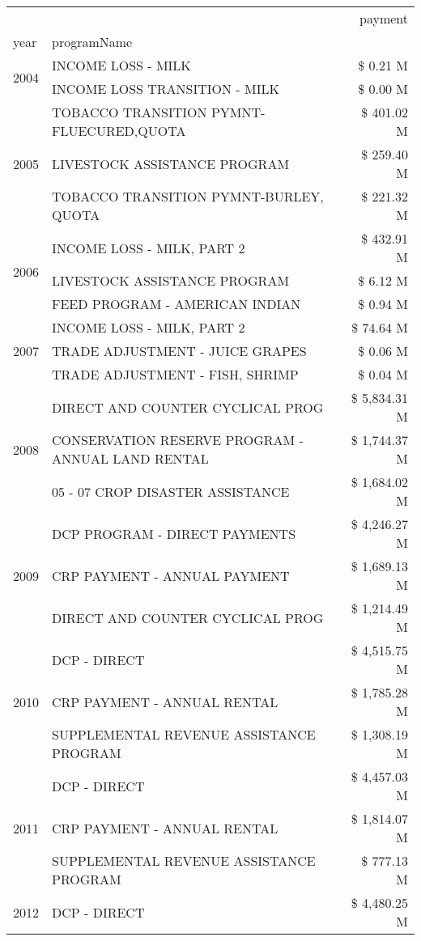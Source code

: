 \begin{tabular}{llr}
\toprule
 &  & payment \\
year & programName &  \\
\midrule
\multirow[t]{2}{*}{2004} & INCOME LOSS - MILK & \$ 0.21 M \\
 & INCOME LOSS TRANSITION - MILK & \$ 0.00 M \\
\cline{1-3}
\multirow[t]{3}{*}{2005} & TOBACCO TRANSITION PYMNT-FLUECURED,QUOTA & \$ 401.02 M \\
 & LIVESTOCK ASSISTANCE PROGRAM & \$ 259.40 M \\
 & TOBACCO TRANSITION PYMNT-BURLEY, QUOTA & \$ 221.32 M \\
\cline{1-3}
\multirow[t]{3}{*}{2006} & INCOME LOSS - MILK, PART 2 & \$ 432.91 M \\
 & LIVESTOCK ASSISTANCE PROGRAM & \$ 6.12 M \\
 & FEED PROGRAM - AMERICAN INDIAN & \$ 0.94 M \\
\cline{1-3}
\multirow[t]{3}{*}{2007} & INCOME LOSS - MILK, PART 2 & \$ 74.64 M \\
 & TRADE ADJUSTMENT - JUICE GRAPES & \$ 0.06 M \\
 & TRADE ADJUSTMENT - FISH, SHRIMP & \$ 0.04 M \\
\cline{1-3}
\multirow[t]{3}{*}{2008} & DIRECT AND COUNTER CYCLICAL PROG & \$ 5,834.31 M \\
 & CONSERVATION RESERVE PROGRAM - ANNUAL LAND RENTAL & \$ 1,744.37 M \\
 & 05 - 07 CROP DISASTER ASSISTANCE & \$ 1,684.02 M \\
\cline{1-3}
\multirow[t]{3}{*}{2009} & DCP PROGRAM - DIRECT PAYMENTS & \$ 4,246.27 M \\
 & CRP PAYMENT - ANNUAL PAYMENT & \$ 1,689.13 M \\
 & DIRECT AND COUNTER CYCLICAL PROG & \$ 1,214.49 M \\
\cline{1-3}
\multirow[t]{3}{*}{2010} & DCP - DIRECT & \$ 4,515.75 M \\
 & CRP PAYMENT - ANNUAL RENTAL & \$ 1,785.28 M \\
 & SUPPLEMENTAL REVENUE ASSISTANCE PROGRAM & \$ 1,308.19 M \\
\cline{1-3}
\multirow[t]{3}{*}{2011} & DCP - DIRECT & \$ 4,457.03 M \\
 & CRP PAYMENT - ANNUAL RENTAL & \$ 1,814.07 M \\
 & SUPPLEMENTAL REVENUE ASSISTANCE PROGRAM & \$ 777.13 M \\
\cline{1-3}
\multirow[t]{3}{*}{2012} & DCP - DIRECT & \$ 4,480.25 M \\

\end{tabular}
